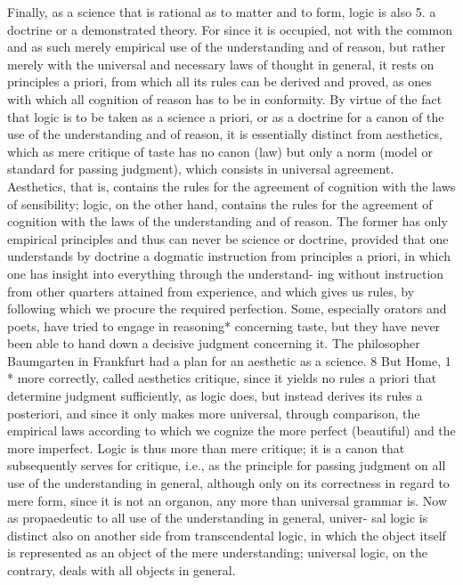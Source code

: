 Finally, as a science that is rational as to matter and to form, logic is also
5. a doctrine or a demonstrated theory. For since it is occupied, not with
the common and as such merely empirical use of the understanding and
of reason, but rather merely with the universal and necessary laws of
thought in general, it rests on principles a priori, from which all its rules
can be derived and proved, as ones with which all cognition of reason has
to be in conformity.
By virtue of the fact that logic is to be taken as a science a priori, or as
a doctrine for a canon of the use of the understanding and of reason, it
is essentially distinct from aesthetics, which as mere critique of taste has no
canon (law) but only a norm (model or standard for passing judgment),
which consists in universal agreement. Aesthetics, that is, contains the
rules for the agreement of cognition with the laws of sensibility; logic, on
the other hand, contains the rules for the agreement of cognition with
the laws of the understanding and of reason. The former has only
empirical principles and thus can never be science or doctrine, provided
that one understands by doctrine a dogmatic instruction from principles
a priori, in which one has insight into everything through the understand-
ing without instruction from other quarters attained from experience,
and which gives us rules, by following which we procure the required
perfection.
Some, especially orators and poets, have tried to engage in reasoning*
concerning taste, but they have never been able to hand down a decisive
judgment concerning it. The philosopher Baumgarten in Frankfurt had a
plan for an aesthetic as a science. 8 But Home, 1 * more correctly, called
aesthetics critique, since it yields no rules a priori that determine judgment
sufficiently, as logic does, but instead derives its rules a posteriori, and
since it only makes more universal, through comparison, the empirical
laws according to which we cognize the more perfect (beautiful) and the
more imperfect.
Logic is thus more than mere critique; it is a canon that subsequently
serves for critique, i.e., as the principle for passing judgment on all use of
the understanding in general, although only on its correctness in regard to
mere form, since it is not an organon, any more than universal grammar
is.
Now as propaedeutic to all use of the understanding in general, univer-
sal logic is distinct also on another side from transcendental logic, in which
the object itself is represented as an object of the mere understanding;
universal logic, on the contrary, deals with all objects in general.

